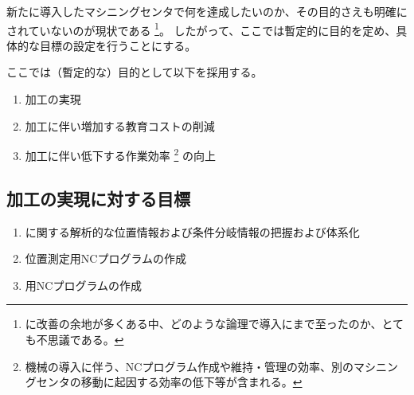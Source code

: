 

新たに導入したマシニングセンタで何を達成したいのか、その目的さえも明確にされていないのが現状である
\footnote{\MMC に改善の余地が多くある中、どのような論理で導入にまで至ったのか、とても不思議である。}。
したがって、ここでは暫定的に目的を定め、具体的な目標の設定を行うことにする。



ここでは（暫定的な）目的として以下を採用する。
\begin{enumerate}[label=\sarrow]
\item \Dimple 加工の実現
\item \Dimple 加工に伴い増加する教育コストの削減
\item \Dimple 加工に伴い低下する作業効率%
\footnote{機械の導入に伴う、NCプログラム作成や維持・管理の効率、別のマシニングセンタの移動に起因する効率の低下等が含まれる。}
の向上
\end{enumerate}





\subsection{\Dimple 加工の実現に対する目標}
\begin{enumerate}[label=\sarrow]
\item \Dimple に関する解析的な位置情報および条件分岐情報の把握および体系化
\item \Dimple 位置測定用NCプログラムの作成
\item \DimpleMilling 用NCプログラムの作成
\end{enumerate}


